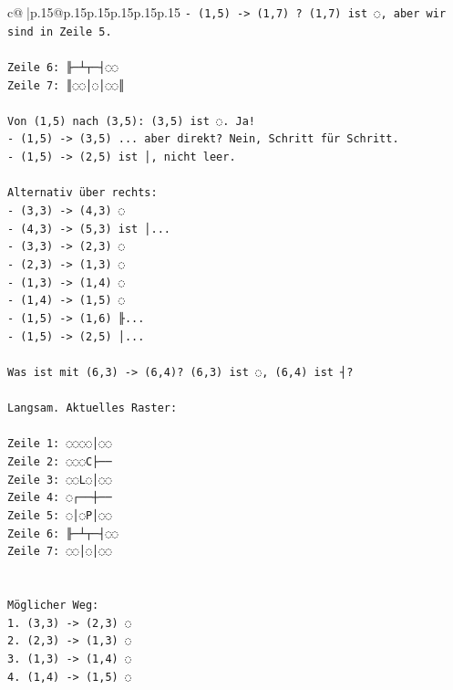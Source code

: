 \documentclass{article}
\begin{document}
{\begin{supertabular}{c@{$\;$}|p{.15\linewidth}@{}p{.15\linewidth}p{.15\linewidth}p{.15\linewidth}p{.15\linewidth}p{.15\linewidth}}
{{{\texttt{{-} (1,5) {-}> (1,7) ? (1,7) ist ◌, aber wir sind in Zeile 5.} \\
\\ 
\texttt{Zeile 6: ╟─┴┬─┤◌◌} \\
\texttt{Zeile 7: ║◌◌│◌│◌◌║} \\
\\ 
\texttt{Von (1,5) nach (3,5): (3,5) ist ◌. Ja!} \\
\texttt{{-} (1,5) {-}> (3,5) ... aber direkt? Nein, Schritt für Schritt.} \\
\texttt{{-} (1,5) {-}> (2,5) ist │, nicht leer.} \\
\\ 
\texttt{Alternativ über rechts:} \\
\texttt{{-} (3,3) {-}> (4,3) ◌} \\
\texttt{{-} (4,3) {-}> (5,3) ist │... } \\
\texttt{{-} (3,3) {-}> (2,3) ◌} \\
\texttt{{-} (2,3) {-}> (1,3) ◌} \\
\texttt{{-} (1,3) {-}> (1,4) ◌} \\
\texttt{{-} (1,4) {-}> (1,5) ◌} \\
\texttt{{-} (1,5) {-}> (1,6) ╟... } \\
\texttt{{-} (1,5) {-}> (2,5) │...} \\
\\ 
\texttt{Was ist mit (6,3) {-}> (6,4)? (6,3) ist ◌, (6,4) ist ┤?} \\
\\ 
\texttt{Langsam. Aktuelles Raster:} \\
\\ 
\texttt{Zeile 1: ◌◌◌◌│◌◌} \\
\texttt{Zeile 2: ◌◌◌C├──} \\
\texttt{Zeile 3: ◌◌L◌│◌◌} \\
\texttt{Zeile 4: ◌┌──┼──} \\
\texttt{Zeile 5: ◌│◌P│◌◌} \\
\texttt{Zeile 6: ╟─┴┬─┤◌◌} \\
\texttt{Zeile 7: ◌◌│◌│◌◌} \\
\\ 
\\ 
\texttt{Möglicher Weg:} \\
\texttt{1. (3,3) {-}> (2,3) ◌} \\
\texttt{2. (2,3) {-}> (1,3) ◌} \\
\texttt{3. (1,3) {-}> (1,4) ◌} \\
\texttt{4. (1,4) {-}> (1,5) ◌} \\
}}}
\end{supertabular}}
\end{document}
